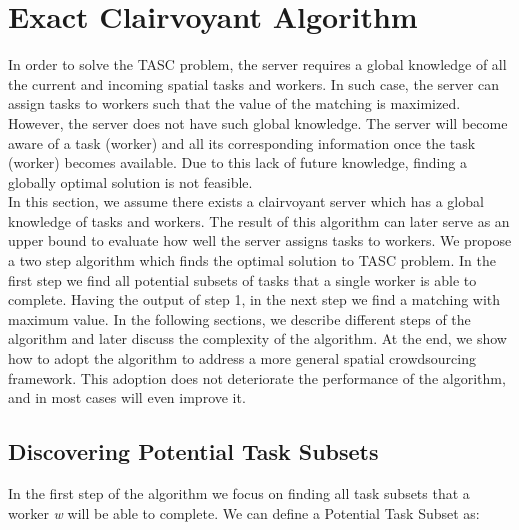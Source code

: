 \section{Exact Clairvoyant Algorithm}
\label{sec:exactalgo}

In order to solve the TASC problem, the server requires a global knowledge of all the current and incoming spatial tasks and workers. In such case, the server can assign tasks to workers such that the value of the matching is maximized. However, the server does not have such global knowledge. The server will become aware of a task (worker) and all its corresponding information once the task (worker) becomes available. Due to this lack of future knowledge, finding a globally optimal solution is not feasible.\\

In this section, we assume there exists a clairvoyant server which has a global knowledge of tasks and workers. The result of this algorithm can later serve as an upper bound to evaluate how well the server assigns tasks to workers. We propose a two step algorithm which finds the optimal solution to TASC problem. In the first step we find all potential subsets of tasks that a single worker is able to complete. Having the output of step 1, in the next step we find a matching with maximum value. In the following sections, we describe different steps of the algorithm and later discuss the complexity of the algorithm. At the end, we show how to adopt the algorithm to address a more general spatial crowdsourcing framework. This adoption does not deteriorate the performance of the algorithm, and in most cases will even improve it.

\subsection{Discovering Potential Task Subsets}
\label{subsec:FindPTS}
In the first step of the algorithm we focus on finding all task subsets that a worker \emph{w} will be able to complete. We can define a Potential Task Subset as:

